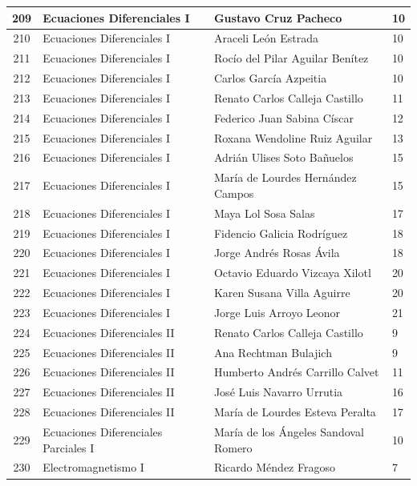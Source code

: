 {\begin{longtable}{|c|p{6.5cm}|p{5cm}|p{1.5cm}|}
  209 & Ecuaciones Diferenciales I & Gustavo Cruz Pacheco & 10 \\ \hline 
  210 & Ecuaciones Diferenciales I & Araceli León Estrada & 10 \\ \hline 
  211 & Ecuaciones Diferenciales I & Rocío del Pilar Aguilar Benítez & 10 \\ \hline 
  212 & Ecuaciones Diferenciales I & Carlos García Azpeitia & 10 \\ \hline 
  213 & Ecuaciones Diferenciales I & Renato Carlos Calleja Castillo & 11 \\ \hline 
  214 & Ecuaciones Diferenciales I & Federico Juan Sabina Císcar & 12 \\ \hline 
  215 & Ecuaciones Diferenciales I & Roxana Wendoline Ruiz Aguilar & 13 \\ \hline 
  216 & Ecuaciones Diferenciales I & Adrián Ulises Soto Bañuelos & 15 \\ \hline 
  217 & Ecuaciones Diferenciales I & María de Lourdes Hernández Campos & 15 \\ \hline 
  218 & Ecuaciones Diferenciales I & Maya Lol Sosa Salas & 17 \\ \hline 
  219 & Ecuaciones Diferenciales I & Fidencio Galicia Rodríguez & 18 \\ \hline 
  220 & Ecuaciones Diferenciales I & Jorge Andrés Rosas Ávila & 18 \\ \hline 
  221 & Ecuaciones Diferenciales I & Octavio Eduardo Vizcaya Xilotl & 20 \\ \hline 
  222 & Ecuaciones Diferenciales I & Karen Susana Villa Aguirre & 20 \\ \hline 
  223 & Ecuaciones Diferenciales I & Jorge Luis Arroyo Leonor & 21 \\ \hline 
  224 & Ecuaciones Diferenciales II & Renato Carlos Calleja Castillo & 9 \\ \hline 
  225 & Ecuaciones Diferenciales II & Ana Rechtman Bulajich & 9 \\ \hline 
  226 & Ecuaciones Diferenciales II & Humberto Andrés Carrillo Calvet & 11 \\ \hline 
  227 & Ecuaciones Diferenciales II & José Luis Navarro Urrutia & 16 \\ \hline 
  228 & Ecuaciones Diferenciales II & María de Lourdes Esteva Peralta & 17 \\ \hline 
  229 & Ecuaciones Diferenciales Parciales I & María de los Ángeles Sandoval Romero & 10 \\ \hline 
  230 & Electromagnetismo I & Ricardo Méndez Fragoso & 7 \\ \hline 

\end{longtable}}
